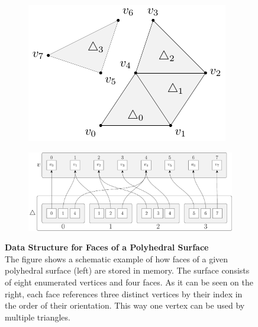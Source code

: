 \documentclass{stdlocal}
\begin{document}
  \begin{figure}
    \centering
    \begin{subfigure}[c]{0.35\linewidth}
      \centering
      \includegraphics[width=\linewidth]{figures/polyhedral-surface-struct-base-scheme.pdf}
    \end{subfigure}
    \hfill
    \begin{subfigure}[c]{0.63\linewidth}
      \centering
      \includegraphics[width=\linewidth]{figures/polyhedral-surface-struct-base.pdf}
    \end{subfigure}
    \caption[Data Structure for Faces of a Polyhedral Surface]{%
      \textbf{Data Structure for Faces of a Polyhedral Surface}\\
      The figure shows a schematic example of how faces of a given polyhedral surface (left) are stored in memory.
      The surface consists of eight enumerated vertices and four faces.
      As it can be seen on the right, each face references three distinct vertices by their index in the order of their orientation.
      This way one vertex can be used by multiple triangles.
    }
    \label{fig:polyhedral-surface-faces}
  \end{figure}
\end{document}
